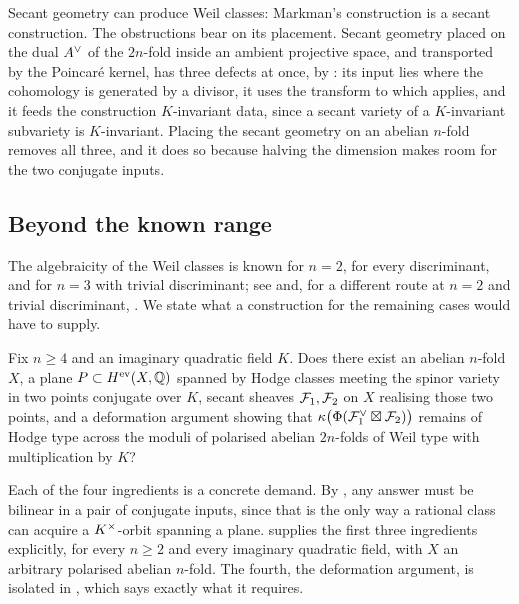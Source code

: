 \begin{remark}\label{rem:secantlesson}
Secant geometry can produce Weil classes: Markman's construction is a secant
construction. The obstructions bear on its placement. Secant geometry placed
on the dual $A^{\vee}$ of the $2n$-fold inside an ambient projective space, and
transported by the Poincar\'e kernel, has three defects at once, by
: its input lies where the cohomology is generated by
a divisor, it uses the transform to which  applies, and it
feeds the construction $K$-invariant data, since a secant variety of a
$K$-invariant subvariety is $K$-invariant. Placing the secant geometry on an
abelian $n$-fold removes all three, and it does so because halving the
dimension makes room for the two conjugate inputs.
\end{remark}

\subsection{Beyond the known range}

The algebraicity of the Weil classes is known for $n=2$, for every
discriminant, and for $n=3$ with trivial discriminant; see \cite{Mar25b} and,
for a different route at $n=2$ and trivial discriminant, \cite{FF26}. We state
what a construction for the remaining cases would have to supply.

\begin{question}\label{q:higher}
Fix $n\ge4$ and an imaginary quadratic field $K$. Does there exist an abelian
$n$-fold $X$, a plane $P\subset H^{\mathrm{ev}}(X,\mathbb{Q})$ spanned by Hodge
classes meeting the spinor variety in two points conjugate over $K$, secant
sheaves $\mathcal{F}_{1},\mathcal{F}_{2}$ on $X$ realising those two points, and a deformation
argument showing that $\kappa\bigl(\Phi(\mathcal{F}_{1}^{\vee}\boxtimes\mathcal{F}_{2})\bigr)$
remains of Hodge type across the moduli of polarised abelian $2n$-folds of
Weil type with multiplication by $K$?
\end{question}

Each of the four ingredients is a concrete demand. By
, any answer must be bilinear in a pair of conjugate
inputs, since that is the only way a rational class can acquire a
$K^{\times}$-orbit spanning a plane.  supplies the first three
ingredients explicitly, for every $n\ge2$ and every imaginary quadratic field,
with $X$ an arbitrary polarised abelian $n$-fold. The fourth, the deformation
argument, is isolated in , which says exactly what it
requires.


